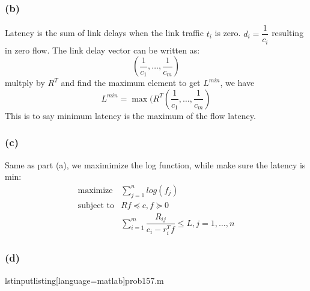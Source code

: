 \documentclass{article}
\begin{document}
\subsubsection*{(b)}
Latency is the sum of link delays when the link traffic $t_i$ is zero. $d_i = \dfrac{1}{c_i}$ resulting in zero flow. The link delay vector can be written as:
\[(\dfrac{1}{c_1},\dots,\dfrac{1}{c_m})\]
multply by $R^T$ and find the maximum element to get $L^{min}$, we have 
\[L^{min}=\max(R^T(\dfrac{1}{c_1},\dots,\dfrac{1}{c_m})\]
This is to say minimum latency is the maximum of the flow latency.
\subsubsection*{(c)}
Same as part (a), we maximimize the log function, while make sure the latency is min:
 \[  \boxed{  \begin{array}{ll}
    \mbox{maximize}   &\sum_{j=1}^{n}log(f_j)\\
    \mbox{subject to} & Rf \preceq c, f \succeq 0 \\
    & \sum_{i=1}^{m}\dfrac{R_{ij}}{c_i-r_i^Tf} \le L, j=1,\dots,n 
            \end{array} 
   }
  \]   
\subsubsection*{(d)}
 lstinputlisting[language=matlab]{prob157.m}
\end{document}
